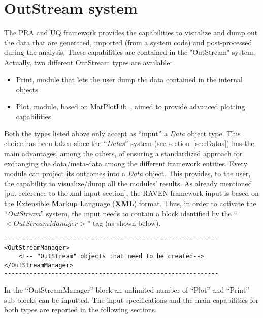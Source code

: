 \section{OutStream system}
The PRA and UQ framework provides the capabilities to visualize and dump out the data that are  generated, imported (from a system code) and post-processed during the analysis. These capabilities are contained in the "OutStream" system. Actually, two different OutStream types are available:
\vspace{-5mm}
\begin{itemize}
\itemsep0em
\item Print, module that lets the user dump the data contained in the internal objects 
\item Plot, module, based on MatPlotLib~\cite{MatPlotLib}, aimed to provide advanced plotting capabilities 
\end{itemize}
\vspace{-5mm}

Both the types listed above only accept as ``input'' a \textit{Data} object type. This choice has been taken since the ``\textit{Datas}'' system (see section~\ref{sec:Datas}) has the main advantages, among the others, of ensuring a standardized approach for exchanging the data/meta-data among the different framework entities. Every module can project its outcomes into a \textit{Data} object. This provides, to the user, the capability to visualize/dump all the modules' results. 
As already mentioned [put reference to the xml input section], the RAVEN framework input is based on the \textbf{E}xtensible \textbf{M}arkup \textbf{L}anguage (\textbf{XML}) format. Thus, in order to activate the ``\textit{OutStream}'' system, the input needs to contain a block identified by the ``\textbf{$<OutStreamManager>$}'' tag (as shown below).  

\begin{lstlisting}[style=XML]
-----------------------------------------------------------
<OutStreamManager>
    <!-- "OutStream" objects that need to be created-->
</OutStreamManager>
-----------------------------------------------------------
\end{lstlisting}
In the ``OutStreamManager'' block an unlimited number of ``Plot'' and ``Print'' sub-blocks can be inputted. The input specifications and the main capabilities for both types are reported in the following sections.
%
%
